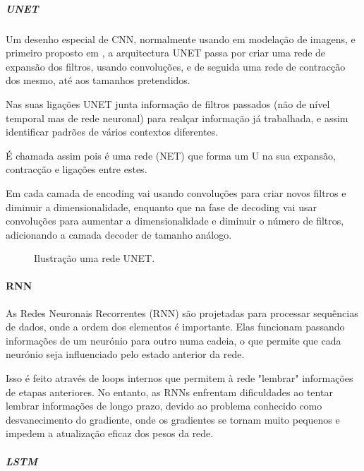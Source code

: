 \subparagraph{UNET\label{se:unet_sec}}
\text{ }  \par
Um desenho especial de \gls{CNN}, normalmente usando em modelação de imagens, e primeiro proposto em \cite{Shelhamer2014}, a arquitectura UNET passa por criar uma rede de expansão dos filtros, usando convoluções, e de seguida uma rede de contracção dos mesmo, até aos tamanhos pretendidos.\par
Nas suas ligações UNET junta informação de filtros passados (não de nível temporal mas de rede neuronal) para realçar informação já trabalhada, e assim identificar padrões de vários contextos diferentes.\par
É chamada assim pois é uma rede (NET) que forma um U na sua expansão, contracção e ligações entre estes.\par
Em cada camada de encoding vai usando convoluções para criar novos filtros e diminuir a dimensionalidade, enquanto que na fase de decoding vai usar convoluções para aumentar a dimensionalidade e diminuir o número de filtros, adicionando a camada decoder de tamanho análogo.\par

\begin{figure}[H]
	\centering
	\resizebox{\linewidth}{!}{}
	\caption{Ilustração uma rede UNET.}
	\label{fig:unet_graph}
\end{figure}


\paragraph{RNN\label{se:rnn_sec}}
\text{ }  \par

As Redes Neuronais Recorrentes (RNN) são projetadas para processar sequências de dados, onde a ordem dos elementos é importante. Elas funcionam passando informações de um neurónio para outro numa cadeia, o que permite que cada neurónio seja influenciado pelo estado anterior da rede.\par
Isso é feito através de loops internos que permitem à rede "lembrar" informações de etapas anteriores. No entanto, as RNNs enfrentam dificuldades ao tentar lembrar informações de longo prazo, devido ao problema conhecido como desvanecimento do gradiente, onde os gradientes se tornam muito pequenos e impedem a atualização eficaz dos pesos da rede.\par

\subparagraph{LSTM\label{se:lstms_sec}}
\text{ }  \par

